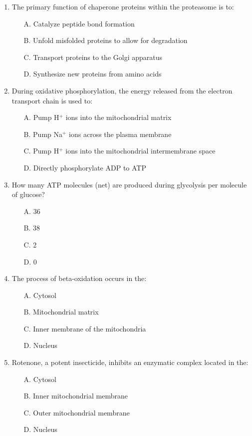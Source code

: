 \documentclass{article}
\begin{document}
\begin{enumerate}
    \item The primary function of chaperone proteins within the proteasome is to:
    \begin{itemize}
        \item[A.] Catalyze peptide bond formation
        \item[B.] Unfold misfolded proteins to allow for degradation
        \item[C.]  Transport proteins to the Golgi apparatus
        \item[D.]  Synthesize new proteins from amino acids
    \end{itemize}

    \item During oxidative phosphorylation, the energy released from the electron transport chain is used to:
    \begin{itemize}
        \item[A.]  Pump H$^+$ ions into the mitochondrial matrix
        \item[B.]  Pump Na$^+$ ions across the plasma membrane
        \item[C.] Pump H$^+$ ions into the mitochondrial intermembrane space
        \item[D.] Directly phosphorylate ADP to ATP
    \end{itemize}

    \item How many ATP molecules (net) are produced during glycolysis per molecule of glucose?
    \begin{itemize}
        \item[A.] 36
        \item[B.] 38
        \item[C.] 2
        \item[D.] 0
    \end{itemize}

    \item  The process of beta-oxidation occurs in the:
    \begin{itemize}
        \item[A.] Cytosol
        \item[B.] Mitochondrial matrix
        \item[C.] Inner membrane of the mitochondria
        \item[D.] Nucleus
    \end{itemize}

    \item  Rotenone, a potent insecticide, inhibits an enzymatic complex located in the:
    \begin{itemize}
        \item[A.]  Cytosol
        \item[B.] Inner mitochondrial membrane
        \item[C.] Outer mitochondrial membrane
        \item[D.] Nucleus
    \end{itemize}


\end{enumerate}
\end{document}
